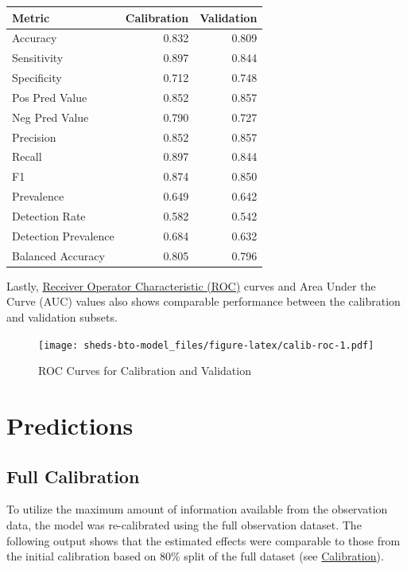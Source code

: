 \documentclass[
]{book}
\begin{document}
\begin{tabular}{l|r|r}
\hline
Metric & Calibration & Validation\\
\hline
Accuracy & 0.832 & 0.809\\
\hline
Sensitivity & 0.897 & 0.844\\
\hline
Specificity & 0.712 & 0.748\\
\hline
Pos Pred Value & 0.852 & 0.857\\
\hline
Neg Pred Value & 0.790 & 0.727\\
\hline
Precision & 0.852 & 0.857\\
\hline
Recall & 0.897 & 0.844\\
\hline
F1 & 0.874 & 0.850\\
\hline
Prevalence & 0.649 & 0.642\\
\hline
Detection Rate & 0.582 & 0.542\\
\hline
Detection Prevalence & 0.684 & 0.632\\
\hline
Balanced Accuracy & 0.805 & 0.796\\
\hline
\end{tabular}

Lastly, \href{https://en.wikipedia.org/wiki/Receiver_operating_characteristic}{Receiver Operator Characteristic (ROC)} curves and Area Under the Curve (AUC) values also shows comparable performance between the calibration and validation subsets.

\begin{figure}
\centering
\texttt{[image: sheds-bto-model\_files/figure-latex/calib-roc-1.pdf]}
\caption{\label{fig:calib-roc}ROC Curves for Calibration and Validation}
\end{figure}

\hypertarget{predictions}{%
\chapter{Predictions}\label{predictions}}

\hypertarget{full-calibration}{%
\section{Full Calibration}\label{full-calibration}}

To utilize the maximum amount of information available from the observation data, the model was re-calibrated using the full observation dataset. The following output shows that the estimated effects were comparable to those from the initial calibration based on 80\% split of the full dataset (see \protect\hyperlink{calibration}{Calibration}).
\end{document}
